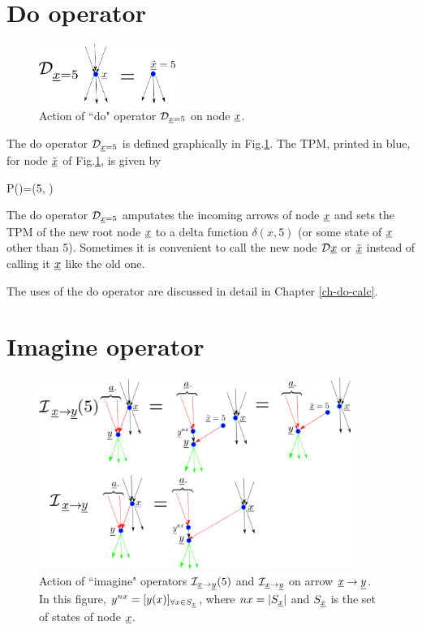 \section{Do operator}


\begin{figure}[h!]
\centering
\includegraphics[width=1.75in]
{counterf/rho-op.png}
\caption{Action
of ``do" operator ${\cal D}_{{\underline{x}}=5}$
on node ${\underline{x}}$.} 
\label{fig-rho-op}
\end{figure}

The do operator ${\cal D}_{{\underline{x}}=5}$
is defined graphically in Fig.\ref{fig-rho-op}.
The TPM, printed in blue,
 for node $\tilde{{\underline{x}}}$ of Fig.\ref{fig-rho-op},
is given by

\beq\color{blue}
P()=\delta(5, )
\eeq


The do operator ${\cal D}_{{\underline{x}}=5}$
amputates
the incoming arrows of node ${\underline{x}}$
and sets the TPM
of the new root node ${\underline{x}}$
to a delta function $\delta(x, 5)$
(or some state of ${\underline{x}}$ other than 5).
Sometimes it is convenient
to call the new node
${\cal D}{\underline{x}}$
or $\tilde{{\underline{x}}}$
instead of calling it
${\underline{x}}$ like the old one.

The uses of the do operator are discussed
in detail in Chapter \ref{ch-do-calc}.

\section{Imagine operator}

\begin{figure}[h!]
\centering
\includegraphics[width=4in]
{counterf/kappa.png}
\caption{Action of ``imagine" operators 
${\cal I}_{{\underline{x}}\rightarrow {\underline{y}}}(5)$
and ${\cal I}_{{\underline{x}}\rightarrow {\underline{y}}}$
on arrow ${\underline{x}}\rightarrow {\underline{y}}$.
In this figure, $y^{nx}=[y(x)]_{\forall x\in S_{\underline{x}}}$,
where $nx=|S_{\underline{x}}|$
and $S_{\underline{x}}$ is the set of states of node ${\underline{x}}$.
} 
\label{fig-kappa}
\end{figure}

